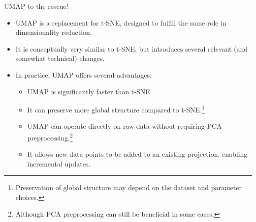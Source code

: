 \begin{frame}[allowframebreaks]{UMAP to the rescue!}
    \begin{itemize}
        \item UMAP is a replacement for t-SNE, designed to fulfill the same role in dimensionality reduction.
        \item It is conceptually very similar to t-SNE, but introduces several relevant (and somewhat technical) changes.
        \item In practice, UMAP offers several advantages:
        \begin{itemize}
            \item UMAP is significantly faster than t-SNE.
            \item It can preserve more global structure compared to t-SNE.\footnote{Preservation of global structure may depend on the dataset and parameter choices.}
            \item UMAP can operate directly on raw data without requiring PCA preprocessing.\footnote{Although PCA preprocessing can still be beneficial in some cases.}
            \item It allows new data points to be added to an existing projection, enabling incremental updates.
        \end{itemize}
    \end{itemize}
\end{frame}


